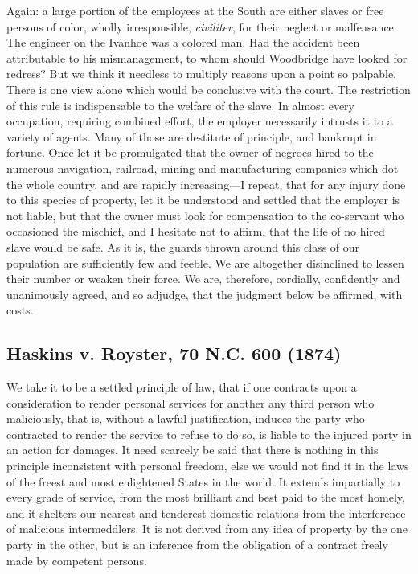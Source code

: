 \documentclass[
  letterpaper,
  11pt,
  DIV=9,
  openright]{scrbook}
\begin{document}

Again: a large portion of the employees at the South are either slaves
or free persons of color, wholly irresponsible, \emph{civiliter}, for
their neglect or malfeasance. The engineer on the Ivanhoe was a colored
man. Had the accident been attributable to his mismanagement, to whom
should Woodbridge have looked for redress? But we think it needless to
multiply reasons upon a point so palpable. There is one view alone which
would be conclusive with the court. The restriction of this rule is
indispensable to the welfare of the slave. In almost every occupation,
requiring combined effort, the employer necessarily intrusts it to a
variety of agents. Many of those are destitute of principle, and
bankrupt in fortune. Once let it be promulgated that the owner of
negroes hired to the numerous navigation, railroad, mining and
manufacturing companies which dot the whole country, and are rapidly
increasing---I repeat, that for any injury done to this species of
property, let it be understood and settled that the employer is not
liable, but that the owner must look for compensation to the co-servant
who occasioned the mischief, and I hesitate not to affirm, that the life
of no hired slave would be safe. As it is, the guards thrown around this
class of our population are sufficiently few and feeble. We are
altogether disinclined to lessen their number or weaken their force. We
are, therefore, cordially, confidently and unanimously agreed, and so
adjudge, that the judgment below be affirmed, with costs.

\subsection{Haskins v. Royster, 70 N.C. 600
(1874)}\label{haskins-v.-royster-70-n.c.-600-1874}

We take it to be a settled principle of law, that if one contracts upon
a consideration to render personal services for another any third person
who maliciously, that is, without a lawful justification, induces the
party who contracted to render the service to refuse to do so, is liable
to the injured party in an action for damages. It need scarcely be said
that there is nothing in this principle inconsistent with personal
freedom, else we would not find it in the laws of the freest and most
enlightened States in the world. It extends impartially to every grade
of service, from the most brilliant and best paid to the most homely,
and it shelters our nearest and tenderest domestic relations from the
interference of malicious intermeddlers. It is not derived from any idea
of property by the one party in the other, but is an inference from the
obligation of a contract freely made by competent persons.
\end{document}

